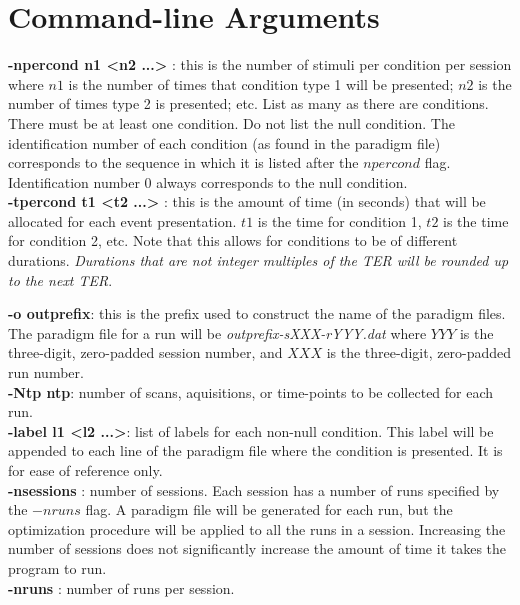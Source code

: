 \documentclass[10pt]{article}
\begin{document}
\section{Command-line Arguments}

\noindent
{\bf -npercond n1 <n2 ...> }: this is the number of stimuli per
condition per session where $n1$ is the number of times that condition
type 1 will be presented; $n2$ is the number of times type
2 is presented; etc. List as many as there are conditions. There must
be at least one condition. Do not list the null condition.  The
identification number of each condition (as found in the paradigm
file) corresponds to the sequence in which it is listed after the
$npercond$ flag.  Identification number 0 always corresponds to the
null condition.\\

\noindent
{\bf -tpercond t1 <t2 ...> }: this is the amount of time (in seconds)
that will be allocated for each event presentation.  $t1$ is the time
for condition 1, $t2$ is the time for condition 2, etc.  Note that
this allows for conditions to be of different durations. {\em Durations
that are not integer multiples of the TER will be rounded up to the
next TER}.

\noindent
{\bf -o outprefix}: this is the prefix used to construct the name of
the paradigm files.  The paradigm file for a run will be {\em
outprefix-sXXX-rYYY.dat} where $YYY$ is the three-digit, zero-padded session
number, and $XXX$ is the three-digit, zero-padded run
number.\\ 

\noindent
{\bf -Ntp ntp}: number of scans, aquisitions, or time-points to be
collected for each run.\\

\noindent
{\bf -label l1 <l2 ...>}: list of labels for each non-null condition.
This label will be appended to each line of the paradigm file where
the condition is presented.  It is for ease of reference only.\\

\noindent
{\bf -nsessions }: number of sessions.  Each session has a number of
runs specified by the $-nruns$ flag.  A paradigm file will be
generated for each run, but the optimization procedure will be applied
to all the runs in a session.  Increasing the number of sessions does
not significantly increase the amount of time it takes the program to
run.\\ 

\noindent
{\bf -nruns }: number of runs per session.\\
\end{document}
